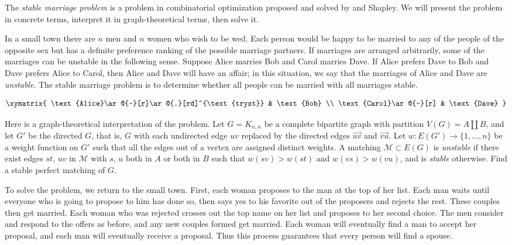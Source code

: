 \documentclass[12pt]{article}
\begin{document}

The \emph{stable marriage problem} is a problem in combinatorial optimization proposed and solved by  and Shapley.  We will present the problem in concrete terms, interpret it in graph-theoretical terms, then solve it.

In a small town there are $n$ men and $n$ women who wish to be wed.  Each person would be happy to be married to any of the people of the opposite sex but has a definite preference ranking of the possible marriage partners.  If marriages are arranged arbitrarily, some of the marriages can be unstable in the following sense.  Suppose Alice marries Bob and Carol marries Dave.  If Alice prefers Dave to Bob and Dave prefers Alice to Carol, then Alice and Dave will have an affair; in this situation, we say that the marriages of Alice and Dave are \emph{unstable}.  The stable marriage problem is to determine whether all people can be married with all marriages stable.

\[\xymatrix{
\text{Alice}\ar@{-}[r]\ar@{.}[rd]^{\text{tryst}} & \text{Bob} \\
\text{Carol}\ar@{-}[r] & \text{Dave}
}\]

Here is a graph-theoretical interpretation of the problem.  Let $G=K_{n,n}$ be a complete bipartite graph with partition $V(G)=A\coprod B$, and let $G'$ be the directed $G$, that is, $G$ with each undirected edge $uv$ replaced by the directed edges $\vec{uv}$ and $\vec{vu}$.  Let $w\colon E(G')\to\{1,\dots,n\}$ be a weight function on $G'$ such that all the edges out of a vertex are assigned distinct weights.  A matching $\mathcal{M}\subset E(G)$ is \emph{unstable} if there exist edges $st$, $uv$ in $\mathcal{M}$ with $s$, $u$  both in $A$ or both in $B$ such that $w(sv)>w(st)$ and $w(vs)>w(vu)$, and is \emph{stable} otherwise.  Find a stable perfect matching of $G$.

To solve the problem, we return to the small town.  First, each woman proposes to the man at the top of her list.  Each man waits until everyone who is going to propose to him has done so, then says yes to his favorite out of the proposers and rejects the rest.  These couples then get married.  Each woman who was rejected crosses out the top name on her list and proposes to her second choice.  The men consider and respond to the offers as before, and any new couples formed get married.  Each woman will eventually find a man to accept her proposal, and each man will eventually receive a proposal.  Thus this process guarantees that every person will find a spouse.
\end{document}
